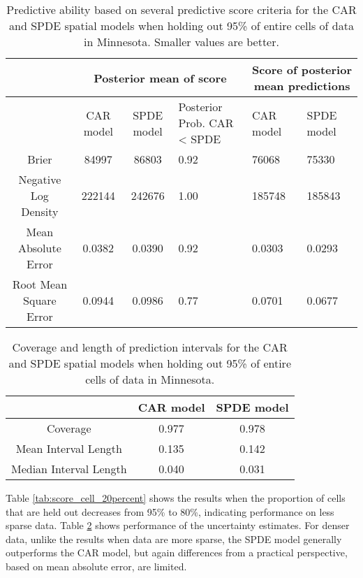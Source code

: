 \documentclass[12pt]{article}\usepackage[]{graphicx}\usepackage[]{color}
\providecommand{\tabularnewline}{\\}
\begin{document}
\begin{table}


\caption{Predictive ability based on several predictive score criteria for
the CAR and SPDE spatial models when holding out 95\% of entire cells
of data in Minnesota. Smaller values are better.}


\begin{tabular}{|c|c|c|>{\centering}p{3cm}|>{\centering}p{2.5cm}|>{\centering}p{2.5cm}|}
\hline 
 &
\multicolumn{3}{c|}{{\small{Posterior mean of score}}} &
\multicolumn{2}{c|}{{\small{Score of posterior mean predictions}}}\tabularnewline
\hline 
\hline 
 &
{\small{CAR model}} &
{\small{SPDE model}} &
{\small{Posterior Prob. CAR < SPDE}} &
{\small{CAR model}} &
{\small{SPDE model}}\tabularnewline
\hline 
{\small{Brier}} &
{\small{84997}} &
{\small{86803}} &
{\small{0.92}} &
{\small{76068}} &
{\small{75330}}\tabularnewline
\hline 
{\small{Negative Log Density}} &
{\small{222144}} &
{\small{242676}} &
{\small{1.00}} &
{\small{185748}} &
{\small{185843}}\tabularnewline
\hline 
{\small{Mean Absolute Error}} &
{\small{0.0382}} &
{\small{0.0390}} &
{\small{0.92}} &
{\small{0.0303}} &
{\small{0.0293}}\tabularnewline
\hline 
{\small{Root Mean Square Error}} &
{\small{0.0944}} &
{\small{0.0986}} &
{\small{0.77}} &
{\small{0.0701}} &
{\small{0.0677}}\tabularnewline
\hline 
\end{tabular}

\label{tab:score_cell_fivepercent}
\end{table}


\begin{table}
\caption{Coverage and length of prediction intervals for the CAR and SPDE spatial
models when holding out 95\% of entire cells of data in Minnesota. }


\begin{tabular}{|c|c|c|}
\hline 
 &
{\small{CAR model}} &
{\small{SPDE model}}\tabularnewline
\hline 
{\small{Coverage}} &
{\small{0.977}} &
{\small{0.978}}\tabularnewline
\hline 
{\small{Mean Interval Length}} &
{\small{0.135}} &
{\small{0.142}}\tabularnewline
\hline 
{\small{Median Interval Length}} &
{\small{0.040}} &
{\small{0.031}}\tabularnewline
\hline 
\end{tabular}

\label{tab:coverage_cell_fivepercent}
\end{table}




Table \ref{tab:score_cell_20percent} shows the results when the proportion
of cells that are held out decreases from 95\% to 80\%, indicating
performance on less sparse data. Table \ref{tab:coverage_cell_fivepercent}
shows performance of the uncertainty estimates. For denser data, unlike
the results when data are more sparse, the SPDE model generally outperforms
the CAR model, but again differences from a practical perspective,
based on mean absolute error, are limited.
\end{document}
